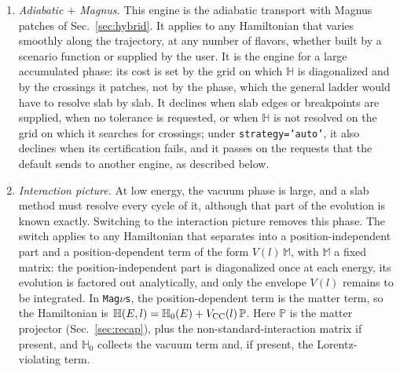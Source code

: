 \documentclass[final,5p,times,twocolumn,sort,compress]{elsarticle}
\makeatletter
\DeclareRobustCommand{\_}{%
  \ifmmode\nfss@text{\textunderscore}\else\textunderscore\allowbreak\fi}
\newcommand{\magnus}{{\tt Mag}\ensuremath{\nu}{\tt s}}
\makeatother
\begin{document}
\begin{enumerate}
When the profile has discontinuities, declared through {\tt t\_breakpoints} or {\tt t\_slab\_edges} (as for the layers of the Earth), $\mathbb{H}$ has no instantaneous eigenstates to transport along. The engine then computes the probability at several energies across a window around the requested one and returns their mean. That mean depends on the width of the window, so it is not the limit returned by the other two routes, and \magnus\ warns whenever it uses this route (Secs.~\ref{sec:average_keyword} and \ref{sec:shock}). Section~\ref{sec:astro} uses this engine for astrophysical neutrinos.
\smallskip
\item \emph{Adiabatic $+$ Magnus.} This engine is the adiabatic transport with Magnus patches of Sec.~\ref{sec:hybrid}. It applies to any Hamiltonian that varies smoothly along the trajectory, at any number of flavors, whether built by a scenario function or supplied by the user. It is the engine for a large accumulated phase: its cost is set by the grid on which $\mathbb{H}$ is diagonalized and by the crossings it patches, not by the phase, which the general ladder would have to resolve slab by slab. It declines when slab edges or breakpoints are supplied, when no tolerance is requested, or when $\mathbb{H}$ is not resolved on the grid on which it searches for crossings; under {\tt strategy='auto'}, it also declines when its certification fails, and it passes on the requests that the default sends to another engine, as described below.
\smallskip
\item \emph{Interaction picture.} At low energy, the vacuum phase is large, and a slab method must resolve every cycle of it, although that part of the evolution is known exactly. Switching to the interaction picture removes this phase. The switch applies to any Hamiltonian that separates into a position-independent part and a position-dependent term of the form $V(l)\,\mathbb{M}$, with $\mathbb{M}$ a fixed matrix: the position-independent part is diagonalized once at each energy, its evolution is factored out analytically, and only the envelope $V(l)$ remains to be integrated. In \magnus, the position-dependent term is the matter term, so the Hamiltonian is $\mathbb{H}(E, l) = \mathbb{H}_0(E) + V_{\rm CC}(l)\,\mathbb{P}$. Here $\mathbb{P}$ is the matter projector (Sec.~\ref{sec:recap}), plus the non-standard-interaction matrix if present, and $\mathbb{H}_0$ collects the vacuum term and, if present, the Lorentz-violating term.


\end{enumerate}
\end{document}
